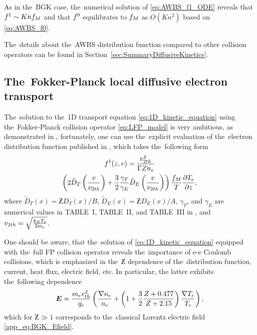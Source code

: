 As in the~BGK case, the~numerical solution of \eqref{eq:AWBS_f1_ODE} reveals
that $f^1 \sim Kn f_M$ and that $f^0$ equilibrates to $f_M$ 
as $O(Kn^2)$ based on \eqref{eq:AWBS_f0}.

The~details about the~AWBS distribution function compared to other
collision operators can be found in Section~\ref{sec:SummaryDiffusiveKinetics}.

\subsection{The~Fokker-Planck local diffusive electron transport}
\label{sec:FPDiffusiveRegime}

The~solution to the~1D transport equation \eqref{eq:1D_kinetic_equation}
using the~Fokker-Planck collision operator \eqref{eq:LFP_model}
is very ambitious, as demonstrated in 
\cite{Chandrasekhar_RMP1943, CSR_1950, Rosenbluth_PR1957}, fortunately, one 
can use the~explicit evaluation of the~electron distribution function
published in \cite{SpitzerHarm_PR1953}, which takes the~following form
\begin{multline}
  \ft^1(z, \vmag) = %
  \frac{\vtwoh^4}{\Gamma\Zbar n_e}\\
  \left( 2\tilde{D}_T\left(\frac{\vmag}{\vtwoh}\right) 
  + \frac{3}{2}\frac{\gamma_T}{\gamma_E} 
  \tilde{D}_E\left(\frac{\vmag}{\vtwoh}\right) \right)%
  \frac{\fM}{T}\pdv{T_e}{z}  ,
  \label{eq:f1_SH}
\end{multline}
where $\tilde{D}_T(x) = \Zbar D_{T}(x) / B$, 
$\tilde{D}_E(x) = \Zbar D_{E}(x) / A$, $\gamma_T$,
and $\gamma_E$ are numerical values in TABLE~I, TABLE~II, and
TABLE~III in \cite{SpitzerHarm_PR1953}, and 
$v_{2 th} = \sqrt{\frac{k_B T_e}{2m_e}}$.

One should be aware, that the~solution of \eqref{eq:1D_kinetic_equation}
equipped with the~full FP collision operator reveals the~importance of
e-e Coulomb collisions, which is emphasized in the~$\Zbar$ dependence 
of the~distribution function, current, heat flux, electric field, etc.
In particular, the latter exhibits the~following dependence 
\cite{SpitzerHarm_PR1953}
\begin{equation}
  \boldsymbol{E} = \frac{m_e v_{th}^2}{q_e}
  \left(\frac{\nabla n_e}{n_e} + 
  \left(1 + \frac{3}{2}\frac{Z + 0.477}{Z + 2.15} \right)
  \frac{\nabla T_e}{T_e} \right),
  \label{eq:SH_Efield} 
\end{equation}
which for $\Zbar\gg1$ corresponds to the~classical Lorentz electric field 
\eqref{app_eq:BGK_Efield}.

